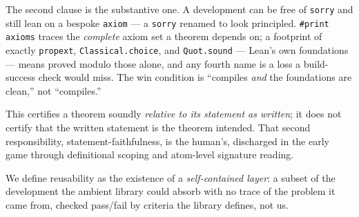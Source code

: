 \documentclass[11pt]{article}
\theoremstyle{plain}
\theoremstyle{definition}
\theoremstyle{remark}
\newcommand{\lean}[1]{\texttt{#1}}
\newcommand{\printaxioms}{\lean{\#print axioms}}
\begin{document}
The second clause is the substantive one. A development can be free of
\lean{sorry} and still lean on a bespoke \lean{axiom} --- a \lean{sorry} renamed
to look principled. \printaxioms{} traces the \emph{complete} axiom set a theorem
depends on; a footprint of exactly \lean{propext}, \lean{Classical.choice}, and
\lean{Quot.sound} --- Lean's own foundations --- means proved modulo those alone,
and any fourth name is a loss a build-success check would miss. The win condition
is ``compiles \emph{and} the foundations are clean,'' not ``compiles.''

This certifies a theorem soundly \emph{relative to its statement as written}; it does
not certify that the written statement is the theorem intended. That second responsibility,
statement-faithfulness, is the human's, discharged in the early game through
definitional scoping and atom-level signature reading.

We define reusability as the existence of a \emph{self-contained layer}: a
subset of the development the ambient library could absorb with no trace of the
problem it came from, checked pass/fail by criteria the library defines, not us.
\end{document}
